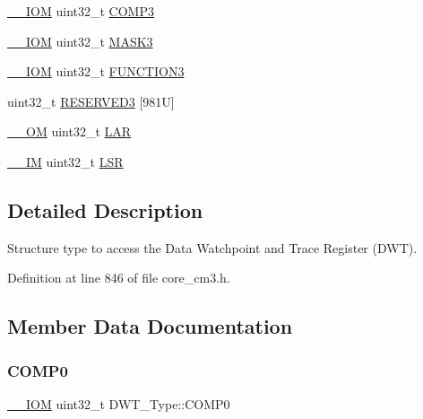 \begin{DoxyCompactItemize}
\hyperlink{core__sc300_8h_ab6caba5853a60a17e8e04499b52bf691}{\+\_\+\+\_\+\+I\+OM} uint32\+\_\+t \hyperlink{struct_d_w_t___type_a85eb73d1848ac3f82d39d6c3e8910847}{C\+O\+M\+P3}
\item 
\hyperlink{core__sc300_8h_ab6caba5853a60a17e8e04499b52bf691}{\+\_\+\+\_\+\+I\+OM} uint32\+\_\+t \hyperlink{struct_d_w_t___type_a2a509d8505c37a3b64f6b24993df5f3f}{M\+A\+S\+K3}
\item 
\hyperlink{core__sc300_8h_ab6caba5853a60a17e8e04499b52bf691}{\+\_\+\+\_\+\+I\+OM} uint32\+\_\+t \hyperlink{struct_d_w_t___type_a52d4ff278fae6f9216c63b74ce328841}{F\+U\+N\+C\+T\+I\+O\+N3}
\item 
uint32\+\_\+t \hyperlink{struct_d_w_t___type_a668febfad1bc5035263c1115af6b4879}{R\+E\+S\+E\+R\+V\+E\+D3} \mbox{[}981\+U\mbox{]}
\item 
\hyperlink{core__sc300_8h_a0ea2009ed8fd9ef35b48708280fdb758}{\+\_\+\+\_\+\+OM} uint32\+\_\+t \hyperlink{struct_d_w_t___type_a4b8037802a3b25e367f0977d86f754ad}{L\+AR}
\item 
\hyperlink{core__sc300_8h_a4cc1649793116d7c2d8afce7a4ffce43}{\+\_\+\+\_\+\+IM} uint32\+\_\+t \hyperlink{struct_d_w_t___type_a4281befcc19ee69afdd50801cb1c9bcf}{L\+SR}
\end{DoxyCompactItemize}


\subsection{Detailed Description}
Structure type to access the Data Watchpoint and Trace Register (D\+WT). 

Definition at line 846 of file core\+\_\+cm3.\+h.



\subsection{Member Data Documentation}
\mbox{\label{struct_d_w_t___type_a61c2965af5bc0643f9af65620b0e67c9}} 
\subsubsection{\texorpdfstring{C\+O\+M\+P0}{COMP0}}
{\footnotesize\ttfamily \hyperlink{core__sc300_8h_ab6caba5853a60a17e8e04499b52bf691}{\+\_\+\+\_\+\+I\+OM} uint32\+\_\+t D\+W\+T\+\_\+\+Type\+::\+C\+O\+M\+P0}

